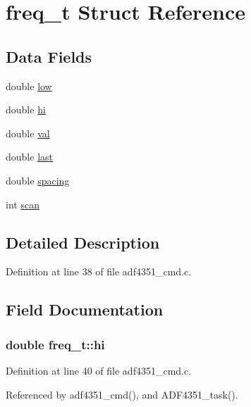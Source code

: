\hypertarget{structfreq__t}{}\section{freq\+\_\+t Struct Reference}
\label{structfreq__t}
\subsection*{Data Fields}
\begin{DoxyCompactItemize}
\item 
double \hyperlink{structfreq__t_a05c64bd7de3b2d127f9c5b1850507220}{low}
\item 
double \hyperlink{structfreq__t_a7467d2b0a15aa7fd7d051f29e3aaa40c}{hi}
\item 
double \hyperlink{structfreq__t_ab480b23ec23b99ffd3e4d628de27676d}{val}
\item 
double \hyperlink{structfreq__t_ac2ff1273277e2381f7e7ab4045d01e24}{last}
\item 
double \hyperlink{structfreq__t_a529edbab4fea39cfe32405d5f8c07ab4}{spacing}
\item 
int \hyperlink{structfreq__t_a7ed144285727b1a56762fb1299e44bf6}{scan}
\end{DoxyCompactItemize}


\subsection{Detailed Description}


Definition at line 38 of file adf4351\+\_\+cmd.\+c.



\subsection{Field Documentation}
\subsubsection[{\texorpdfstring{hi}{hi}}]{\setlength{\rightskip}{0pt plus 5cm}double freq\+\_\+t\+::hi}\hypertarget{structfreq__t_a7467d2b0a15aa7fd7d051f29e3aaa40c}{}\label{structfreq__t_a7467d2b0a15aa7fd7d051f29e3aaa40c}


Definition at line 40 of file adf4351\+\_\+cmd.\+c.



Referenced by adf4351\+\_\+cmd(), and A\+D\+F4351\+\_\+task().

